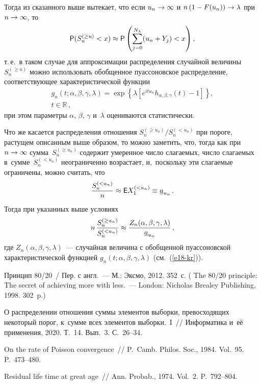 \begin{multicols}{2}
Тогда из сказанного выше вытекает, что если $u_n\hm\to\infty$ и
$n\left(1\hm-F(u_n)\right)\hm\to\lambda$ при $n\hm\to\infty$, то
$$
{\sf P}(S_n^{(\ge u)}<x)\approx{\sf P}
\left(\sum\limits_{j=0}^{N_{\lambda}}(u_n+Y_j)<x\right),
$$
т.\,е.\ в таком случае для аппроксимации распределения случайной
величины $S_n^{(\ge u)}$ можно использовать обобщенное пуассоновское
распределение, соответствующее характеристической функции
\begin{multline}
g_n(t;\alpha,\beta,\gamma,\lambda)=
\exp\left\{\lambda\left[e^{itu_n}h_{\alpha,\beta,\gamma}(t)-
1\right]\right\},\\
t\in\mathbb{R}\,,
\label{e18-kr}
\end{multline}
при этом параметры $\alpha$, $\beta$, $\gamma$ и~$\lambda$
оцениваются статистически.

Что же касается распределения отношения $S_n^{(\ge u_n)}/S_n^{(< u_n)}$ при 
пороге, растущем описанным выше образом, то можно заметить, что, тогда как 
при $n\hm\to\infty$  
сумма~$S_n^{(\ge u_n)}$ содержит умеренное число слагаемых, число слагаемых  
в~сумме~$S_n^{(< u_n)}$ неограниченно возрастает, и,~поскольку эти слагаемые 
ограничены, можно считать, что
$$
\displaystyle\frac{\displaystyle S_n^{(< u_n)}\mathstrut}{\displaystyle n\mathstrut}\approx {\sf E}X_1^{(<u_n)}\equiv \underline{a}_{u_n}\,.
$$
Тогда при указанных выше условиях
$$
n \,\displaystyle\frac{\displaystyle S_n^{(\ge u_n)}\mathstrut}{\displaystyle S_n^{(< u_n)}\mathstrut}\approx \displaystyle\frac{\displaystyle Z_n(\alpha, \beta, 
\gamma, \lambda)\mathstrut}{\displaystyle \underline{a}_{u_n}\mathstrut}\,,
$$
где $Z_n(\alpha, \beta, \gamma, \lambda)$~--- случайная величина с обобщенной 
пуассоновской характеристической функцией 
$g_n(t;\alpha,\beta,\gamma,\lambda)$ (см.~(\ref{e18-kr})).

{\small\frenchspacing
 {%
 \begin{thebibliography}{9}

 Принцип 80/20~/ Пер. с  англ.~--- М.: Эксмо, 2012. 352~с.
( {The 80/20 principle: The secret of achieving more with less}.~--- London: 
Nicholas Brealey Publishing, 1998. 302~p.)

 О распределении отношения суммы элементов выборки, 
превосходящих некоторый порог, к~сумме всех элементов выборки.~I~// 
Информатика и~её применения, 2020. Т.~14. Вып.~3. С.~26--34.

 On the rate of Poisson convergence~// 
P.~Camb. Philos.
Soc., 1984. Vol.~95. P.~473--480.

Residual life time at great age~// Ann. Probab., 1974. Vol.~2. P.~792--804.


\end{thebibliography}}}
\end{multicols}
